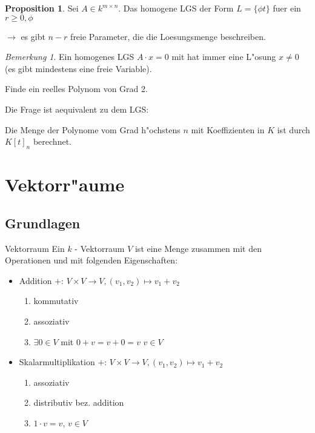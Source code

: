 \documentclass[oneside,fontsize=11pt,paper=a4,BCOR=0mm,DIV=12,automark,headsepline]{scrbook}
\theoremstyle{remark}
\theoremstyle{definition}
\newtheorem*{proposition}{Proposition}
\theoremstyle{definition}
\theoremstyle{remark}
\newtheorem*{bem}{Bemerkung}
\begin{document}
\begin{proposition}
Sei \(A\in k^{m\times n}\). Das homogene LGS der Form \(L=\{\phi
t \}\) fuer ein \(r\geq 0, \phi\)

\(\rightarrow\) es gibt \(n-r\) freie Parameter, die die Loesungsmenge beschreiben.
\end{proposition}

\begin{bem}
 Ein homogenes LGS \(A\cdot x=0\) mit  hat immer eine L"osung \(x\not=
0\) (es gibt mindestens eine freie Variable).
\end{bem}

\begin{exa}
Finde ein reelles Polynom von Grad 2.

Die Frage ist aequivalent zu dem LGS:
\end{exa}

\begin{definition}{}{}
Die Menge der Polynome vom Grad h"ochstens \(n\) mit Koeffizienten in \(K\) ist
durch \(K[t]_n\) berechnet.
\end{definition}

\part{Vektorr"aume}
\chapter{Grundlagen}
\label{sec:org4906e00}
\begin{definition}{Vektorraum}{}
Ein \(k\) - Vektorraum \(V\) ist eine Menge zusammen mit den Operationen und mit
folgenden Eigenschaften:
\begin{itemize}
\item Addition \(+:\, V\times V \to V, (v_1,v_2)\mapsto v_1+v_2\)
\begin{enumerate}
\item kommutativ
\item assoziativ
\item \(\exists 0 \in V\) mit \(0+v=v+0=v\) \(v \in V\)
\end{enumerate}
\item Skalarmultiplikation \(+:\, V\times V \to V, (v_1,v_2)\mapsto v_1+v_2\)
\begin{enumerate}
\item assoziativ
\item distributiv bez. addition
\item \(1\cdot v = v\), \(v\in V\)
\end{enumerate}
\end{itemize}
\end{definition}
\end{document}
